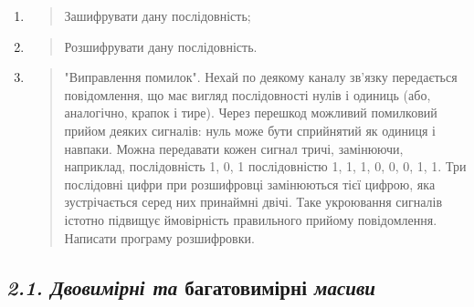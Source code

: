 \documentclass[]{article}
\begin{document}
\begin{enumerate}
\def\labelenumi{\alph{enumi})}
\item
  \begin{quote}
  Зашифрувати дану послідовність;
  \end{quote}
\item
  \begin{quote}
  Розшифрувати дану послідовність.
  \end{quote}
\item
  \begin{quote}
  "Виправлення помилок". Нехай по деякому каналу зв'язку передається
  повідомлення, що має вигляд послідовності нулів і одиниць (або,
  аналогічно, крапок і тире). Через перешкод можливий помилковий прийом
  деяких сигналів: нуль може бути сприйнятий як одиниця і навпаки. Можна
  передавати кожен сигнал тричі, замінюючи, наприклад, послідовність 1,
  0, 1 послідовністю 1, 1, 1, 0, 0, 0, 1, 1. Три послідовні цифри при
  розшифровці замінюються тієї цифрою, яка зустрічається серед них
  принаймні двічі. Таке укроювання сигналів істотно підвищує ймовірність
  правильного прийому повідомлення. Написати програму розшифровки.
  \end{quote}
\end{enumerate}

\subsection{\texorpdfstring{\emph{\emph{2.1. Двовимірні та}}
багатовимірні
\emph{\emph{масиви}}}{2.1. Двовимірні та багатовимірні масиви}}\label{ux434ux432ux43eux432ux438ux43cux456ux440ux43dux456-ux442ux430-ux431ux430ux433ux430ux442ux43eux432ux438ux43cux456ux440ux43dux456-ux43cux430ux441ux438ux432ux438}
\end{document}
